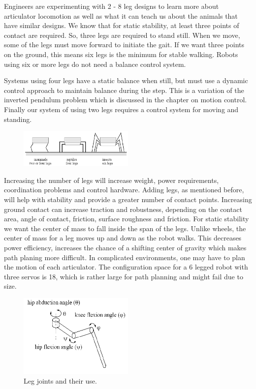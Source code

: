 Engineers are experimenting with 2 - 8 leg designs to learn more about
articulator locomotion as well as what it can teach us about the animals
that have similar designs. We know that for static stability, at least
three points of contact are required. So, three legs are required to
stand still. When we move, some of the legs must move forward to
initiate the gait. If we want three points on the ground, this means six
legs is the minimum for stable walking. Robots using six or more legs do
not need a balance control system.

Systems using four legs have a static balance when still, but must use a
dynamic control approach to maintain balance during the step. This is a
variation of the inverted pendulum problem which is discussed in the
chapter on motion control. Finally our system of using two legs requires
a control system for moving and standing.

\begin{figure}
\centering
\includegraphics[width=0.5\textwidth,height=\textheight]{MotionFigures/legs.png}
\caption{}
\end{figure}

Increasing the number of legs will increase weight, power requirements,
coordination problems and control hardware. Adding legs, as mentioned
before, will help with stability and provide a greater number of contact
points. Increasing ground contact can increase traction and robustness,
depending on the contact area, angle of contact, friction, surface
roughness and friction. For static stability we want the center of mass
to fall inside the span of the legs. Unlike wheels, the center of mass
for a leg moves up and down as the robot walks. This decreases power
efficiency, increases the chance of a shifting center of gravity which
makes path planing more difficult. In complicated environments, one may
have to plan the motion of each articulator. The configuration space for
a 6 legged robot with three servos is 18, which is rather large for path
planning and might fail due to size.

\begin{figure}
\centering
\includegraphics[width=0.5\textwidth,height=\textheight]{MotionFigures/legjoint.png}
\caption{Leg joints and their use.}
\end{figure}

